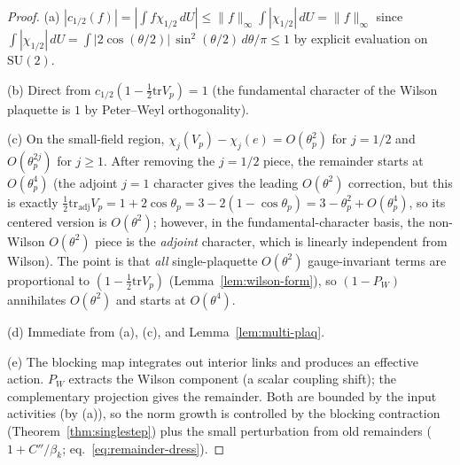 \documentclass[11pt]{article}
\theoremstyle{definition}
\newcommand{\SU}{\mathrm{SU}}
\newcommand{\tr}{\mathrm{tr}}
\begin{document}
\begin{proof}
(a) $|c_{1/2}(f)|=|\int f\chi_{1/2}\,dU|\le\|f\|_\infty
\int|\chi_{1/2}|\,dU=\|f\|_\infty$ since
$\int|\chi_{1/2}|\,dU=\int|2\cos(\theta/2)|\,\sin^2(\theta/2)
\,d\theta/\pi\le 1$ by explicit evaluation on $\SU(2)$.

(b) Direct from $c_{1/2}(1-\frac{1}{2}\tr V_p)=1$
(the fundamental character of the Wilson plaquette is $1$ by
Peter--Weyl orthogonality).

(c) On the small-field region, $\chi_j(V_p)-\chi_j(e)
=O(\theta_p^2)$ for $j=1/2$ and $O(\theta_p^{2j})$ for $j\ge 1$.
After removing the $j=1/2$ piece, the remainder starts at
$O(\theta_p^4)$ (the adjoint $j=1$ character gives the
leading $O(\theta^2)$ correction, but this is exactly
$\frac{1}{2}\tr_{\mathrm{adj}}V_p=
1+2\cos\theta_p=3-2(1-\cos\theta_p)=3-\theta_p^2+O(\theta_p^4)$,
so its centered version is $O(\theta^2)$; however, in the
fundamental-character basis, the non-Wilson $O(\theta^2)$
piece is the \emph{adjoint} character, which is linearly
independent from Wilson).  The point is that \emph{all}
single-plaquette $O(\theta^2)$ gauge-invariant terms are
proportional to $(1-\frac{1}{2}\tr V_p)$
(Lemma~\ref{lem:wilson-form}), so $(1-P_W)$ annihilates
$O(\theta^2)$ and starts at $O(\theta^4)$.

(d) Immediate from (a), (c), and Lemma~\ref{lem:multi-plaq}.

(e) The blocking map integrates out interior links and produces
an effective action.  $P_W$ extracts the Wilson component (a
scalar coupling shift); the complementary projection gives the
remainder.  Both are bounded by the input activities
(by (a)), so the norm growth is controlled by the blocking
contraction (Theorem~\ref{thm:singlestep}) plus the small
perturbation from old remainders ($1+C''/\beta_k$;
eq.~\eqref{eq:remainder-dress}).
\end{proof}
\end{document}
